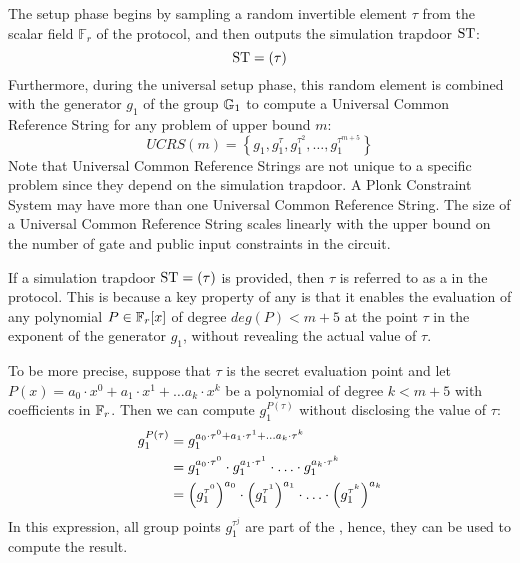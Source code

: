 The setup phase begins by sampling a random invertible element $\tau$ from the scalar field $\mathbb{F}_r$ of the protocol, and then outputs the simulation trapdoor $\mathbf{\mathrm{ST}}$:
\begin{equation}
\label{def:groth16-trapdoor}
\mathrm{ST} = (\tau)
\end{equation}
Furthermore, during the universal setup phase, this random element is combined with the generator $g_1$ of the group $\mathbb{G}_1$ to compute a Universal Common Reference String for any problem of upper bound $m$:
\begin{equation}
\label{def:plonk-ucrs}
UCRS(m) = \left\{g_1, g_1^{\tau}, g_1^{\tau^2},\ldots, g_1^{\tau^{m+5}}\right\}
\end{equation}
Note that Universal Common Reference Strings are not unique to a specific problem since they depend on the simulation trapdoor. A Plonk Constraint System may have more than one Universal Common Reference String. The size of a Universal Common Reference String scales linearly with the upper bound on the number of gate and public input constraints in the circuit.

If a simulation trapdoor $\mathrm{ST} = (\tau)$ is provided, then $\tau$ is referred to as a  in the protocol. This is because a key property of any  is that it enables the evaluation of any polynomial $P\in \mathbb{F}_r[x]$ of degree $deg(P)<m+5$ at the point $\tau$ in the exponent of the generator $g_1$, without revealing the actual value of $\tau$.

To be more precise, suppose that $\tau$ is the secret evaluation point and let $P(x)=a_0\cdot x^0 + a_1\cdot x^1 + \ldots a_k\cdot x^k$ be a polynomial of degree $k<m+5$ with coefficients in $\mathbb{F}_r$. Then we can compute $g_1^{P(\tau)}$ without disclosing the value of $\tau$:
\begin{align}
\label{eq:exp_evaluation-poly-plonk}
g_1^{P(\tau)} & = g_1^{a_0\cdot \tau^0 + a_1\cdot \tau^1 + \ldots a_k\cdot \tau^k} \notag\\
 & = g_1^{a_0\cdot \tau^0} \cdot g_1^{a_1\cdot \tau^1} \cdot \ldots \cdot g_1^{a_k\cdot \tau^k}\notag\\
 & = \Big(g_1^{\tau^0}\Big)^{a_0} \cdot \Big(g_1^{\tau^1}\Big)^{a_1} \cdot \ldots \cdot \Big(g_1^{\tau^k}\Big)^{a_k}
\end{align}
In this expression, all group points $g_1^{\tau^j}$ are part of the , hence, they can be used to compute the result.


